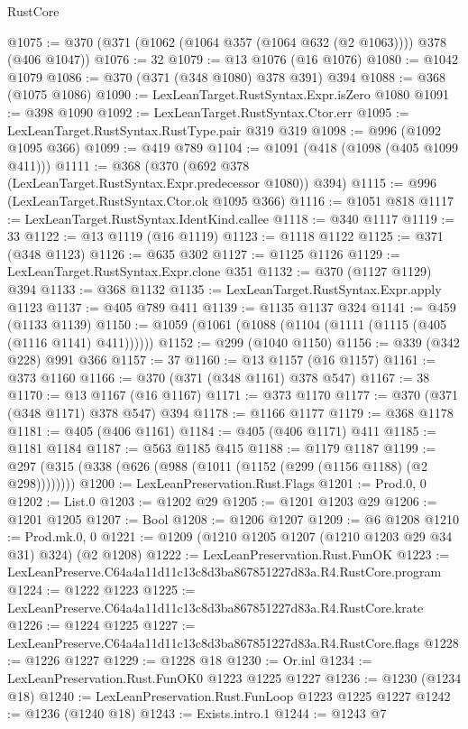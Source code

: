 \begin{lexlean}{RustCore}
\begin{coremodule}
@1075 := @370 (@371 (@1062 (@1064 @357 (@1064 @632 (@2 @1063)))) @378 (@406 @1047))
@1076 := 32
@1079 := @13 @1076 (@16 @1076)
@1080 := @1042 @1079
@1086 := @370 (@371 (@348 @1080) @378 @391) @394
@1088 := @368 (@1075 @1086)
@1090 := LexLeanTarget.RustSyntax.Expr.isZero @1080
@1091 := @398 @1090
@1092 := LexLeanTarget.RustSyntax.Ctor.err
@1095 := LexLeanTarget.RustSyntax.RustType.pair @319 @319
@1098 := @996 (@1092 @1095 @366)
@1099 := @419 @789
@1104 := @1091 (@418 (@1098 (@405 @1099 @411)))
@1111 := @368 (@370 (@692 @378 (LexLeanTarget.RustSyntax.Expr.predecessor @1080)) @394)
@1115 := @996 (LexLeanTarget.RustSyntax.Ctor.ok @1095 @366)
@1116 := @1051 @818
@1117 := LexLeanTarget.RustSyntax.IdentKind.callee
@1118 := @340 @1117
@1119 := 33
@1122 := @13 @1119 (@16 @1119)
@1123 := @1118 @1122
@1125 := @371 (@348 @1123)
@1126 := @635 @302
@1127 := @1125 @1126
@1129 := LexLeanTarget.RustSyntax.Expr.clone @351
@1132 := @370 (@1127 @1129) @394
@1133 := @368 @1132
@1135 := LexLeanTarget.RustSyntax.Expr.apply @1123
@1137 := @405 @789 @411
@1139 := @1135 @1137 @324
@1141 := @459 (@1133 @1139)
@1150 := @1059 (@1061 (@1088 (@1104 (@1111 (@1115 (@405 (@1116 @1141) @411))))))
@1152 := @299 (@1040 @1150)
@1156 := @339 (@342 @228) @991 @366
@1157 := 37
@1160 := @13 @1157 (@16 @1157)
@1161 := @373 @1160
@1166 := @370 (@371 (@348 @1161) @378 @547)
@1167 := 38
@1170 := @13 @1167 (@16 @1167)
@1171 := @373 @1170
@1177 := @370 (@371 (@348 @1171) @378 @547) @394
@1178 := @1166 @1177
@1179 := @368 @1178
@1181 := @405 (@406 @1161)
@1184 := @405 (@406 @1171) @411
@1185 := @1181 @1184
@1187 := @563 @1185 @415
@1188 := @1179 @1187
@1199 := @297 (@315 (@338 (@626 (@988 (@1011 (@1152 (@299 (@1156 @1188) (@2 @298))))))))
@1200 := LexLeanPreservation.Rust.Flags
@1201 := Prod.{0, 0}
@1202 := List.{0}
@1203 := @1202 @29
@1205 := @1201 @1203 @29
@1206 := @1201 @1205
@1207 := Bool
@1208 := @1206 @1207
@1209 := @6 @1208
@1210 := Prod.mk.{0, 0}
@1221 := @1209 (@1210 @1205 @1207 (@1210 @1203 @29 @34 @31) @324) (@2 @1208)
@1222 := LexLeanPreservation.Rust.FunOK
@1223 := LexLeanPreserve.C64a4a11d11c13c8d3ba867851227d83a.R4.RustCore.program
@1224 := @1222 @1223
@1225 := LexLeanPreserve.C64a4a11d11c13c8d3ba867851227d83a.R4.RustCore.krate
@1226 := @1224 @1225
@1227 := LexLeanPreserve.C64a4a11d11c13c8d3ba867851227d83a.R4.RustCore.flags
@1228 := @1226 @1227
@1229 := @1228 @18
@1230 := Or.inl
@1234 := LexLeanPreservation.Rust.FunOK0 @1223 @1225 @1227
@1236 := @1230 (@1234 @18)
@1240 := LexLeanPreservation.Rust.FunLoop @1223 @1225 @1227
@1242 := @1236 (@1240 @18)
@1243 := Exists.intro.{1}
@1244 := @1243 @7

\end{coremodule}
\end{lexlean}
